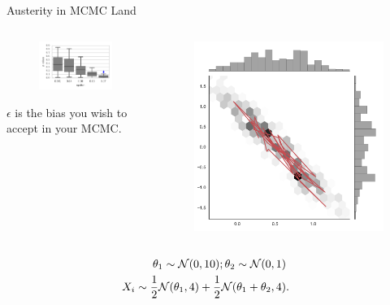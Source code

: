 \documentclass{beamer}
\begin{document}
  \begin{frame}{Austerity in MCMC Land}
\begin{columns}
        \begin{column}{.5\textwidth}
        \begin{figure}
           \includegraphics[width=\textwidth]{img/Heiko1} 
        \end{figure}
        $\epsilon$ is the bias you wish to accept in your MCMC. 
        \end{column}
        \begin{column}{.5\textwidth}
            \begin{figure}
           \includegraphics[width=\textwidth]{img/sgld_sample_wth_trace.pdf} 
        \end{figure}
        \end{column}
    \end{columns}
 \begin{align*}
 \theta_{1}\sim{\cal N}(0,10);\theta_{2}\sim{\cal N}(0,1)\\
 X_{i}\sim\frac{1}{2}{\cal N}(\theta_{1},4)+\frac{1}{2}{\cal N}(\theta_{1}+\theta_{2},4) & .
\end{align*}
 \end{frame}
\end{document}
